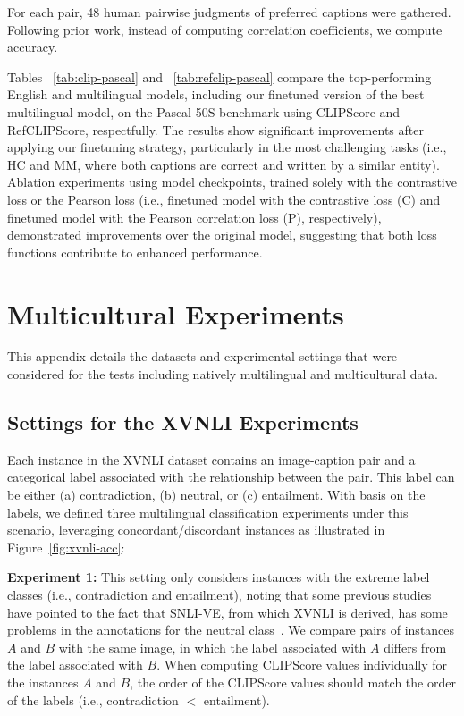 For each pair, 48 human pairwise judgments of preferred captions were gathered. Following prior work, instead of computing correlation coefficients, we compute accuracy.

Tables ~\ref{tab:clip-pascal} and ~\ref{tab:refclip-pascal} compare the top-performing English and multilingual models, including our finetuned version of the best multilingual model, on the Pascal-50S benchmark using CLIPScore and RefCLIPScore, respectfully. The results show significant improvements after applying our finetuning strategy, particularly in the most challenging tasks (i.e., HC and MM, where both captions are correct and written by a similar entity). Ablation experiments using model checkpoints, trained solely with the contrastive loss or the Pearson loss (i.e., finetuned model with the contrastive loss (C) and finetuned model with the Pearson correlation loss (P), respectively), demonstrated improvements over the original model, suggesting that both loss functions contribute to enhanced performance.

\section{Multicultural Experiments} \label{app:multilingual_experiments}

This appendix details the datasets and experimental settings that were considered for the tests including natively multilingual and multicultural data.
\subsection{Settings for the XVNLI Experiments}
Each instance in the XVNLI dataset contains an image-caption pair and a categorical label associated with the relationship between the pair. This label can be either (a) contradiction, (b) neutral, or (c) entailment. With basis on the labels, we defined three multilingual classification experiments under this scenario, leveraging concordant/discordant instances as illustrated in Figure~\ref{fig:xvnli-acc}:

\textbf{Experiment 1:} This setting only considers instances with the extreme label classes (i.e., contradiction and entailment), noting that some previous studies have pointed to the fact that SNLI-VE, from which XVNLI is derived, has some problems in the annotations for the neutral class~\cite{kayser2021vil}. We compare pairs of instances $A$ and $B$ with the same image, in which the label associated with $A$ differs from the label associated with $B$. When computing CLIPScore values individually for the instances $A$ and $B$, the order of the CLIPScore values should match the order of the labels (i.e., contradiction $<$ entailment).

